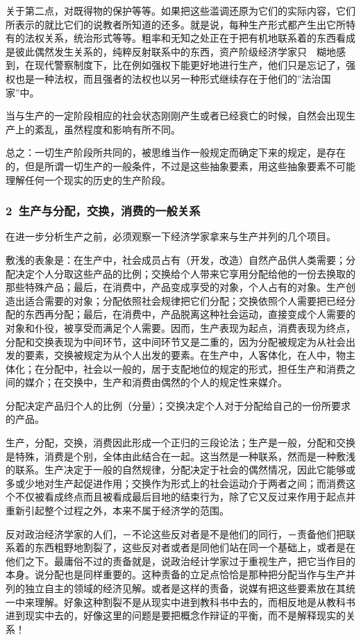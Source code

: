 \documentclass[a4paper,twoside,12pt,AutoFakeBold]{ctexart}
\begin{document}
关于第二点，对既得物的保护等等。如果把这些滥调还原为它们的实际内容，它们所表示的就比它们的说教者所知道的还多。就是说，每种生产形式都产生出它所特有的法权关系，统治形式等等。粗率和无知之处正在于把有机地联系着的东西看成是彼此偶然发生关系的，纯粹反射联系中的东西，资产阶级经济学家只　糊地感到，在现代警察制度下，比在例如强权下能更好地进行生产，他们只是忘记了，强权也是一种法权，而且强者的法权也以另一种形式继续存在于他们的”法治国家”中。

当与生产的一定阶段相应的社会状态刚刚产生或者已经衰亡的时候，自然会出现生产上的紊乱，虽然程度和影响有所不同。

总之：一切生产阶段所共同的，被思维当作一般规定而确定下来的规定，是存在的，但是所谓一切生产的一般条件，不过是这些抽象要素，用这些抽象要素不可能理解任何一个现实的历史的生产阶段。

\subsubsection{2~生产与分配，交换，消费的一般关系}

在进一步分析生产之前，必须观察一下经济学家拿来与生产并列的几个项目。

敷浅的表象是：在生产中，社会成员占有（开发，改造）自然产品供人类需要；分配决定个人分取这些产品的比例；交换给个人带来它享用分配给他的一份去换取的那些特殊产品；最后，在消费中，产品变成享受的对象，个人占有的对象。生产创造出适合需要的对象；分配依照社会规律把它们分配；交换依照个人需要把已经分配的东西再分配；最后，在消费中，产品脱离这种社会运动，直接变成个人需要的对象和仆役，被享受而满足个人需要。因而，生产表现为起点，消费表现为终点，分配和交换表现为中间环节，这中间环节又是二重的，因为分配被规定为从社会出发的要素，交换被规定为从个人出发的要素。在生产中，人客体化，在人中，物主体化；在分配中，社会以一般的，居于支配地位的规定的形式，担任生产和消费之间的媒介；在交换中，生产和消费由偶然的个人的规定性来媒介。

分配决定产品归个人的比例（分量）；交换决定个人对于分配给自己的一份所要求的产品。

生产，分配，交换，消费因此形成一个正归的三段论法；生产是一般，分配和交换是特殊，消费是个别，全体由此结合在一起。这当然是一种联系，然而是一种敷浅的联系。生产决定于一般的自然规律，分配决定于社会的偶然情况，因此它能够或多或少地对生产起促进作用；交换作为形式上的社会运动介于两者之间；而消费这个不仅被看成终点而且被看成最后目地的结束行为，除了它又反过来作用于起点并重新引起整个过程之外，本来不属于经济学的范围。

反对政治经济学家的人们，－不论这些反对者是不是他们的同行，－责备他们把联系着的东西粗野地割裂了，这些反对者或者是同他们站在同一个基础上，或者是在他们之下。最庸俗不过的责备就是，说政治经计学家过于重视生产，把它当作目的本身。说分配也是同样重要的。这种责备的立足点恰恰是那种把分配当作与生产并列的独立自主的领域的经济见解。或者是这样的责备，说媒有把这些要素放在其统一中来理解。好象这种割裂不是从现实中进到教科书中去的，而相反地是从教科书进到现实中去的，好像这里的问题是要把概念作辩证的平衡，而不是解释现实的关系！
\end{document}
